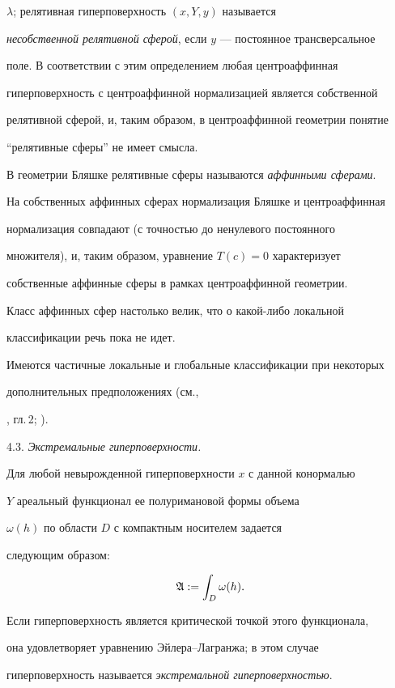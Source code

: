 $\lambda$; релятивная гиперповерхность $(x,Y,y)$ называется


{\it несобственной релятивной сферой}, если $y$ --- постоянное трансверсальное 


поле. В соответствии с этим определением любая центроаффинная


гиперповерхность с центроаффинной нормализацией является собственной


релятивной сферой, и, таким образом, в центроаффинной геометрии понятие


``релятивные сферы'' не имеет смысла.


В геометрии Бляшке релятивные сферы называются {\it аффинными сферами}.


На собственных аффинных сферах нормализация Бляшке и центроаффинная


нормализация совпадают (с точностью до ненулевого постоянного


множителя), и, таким образом, уравнение $T(c)=0$ характеризует


собственные аффинные сферы в рамках центроаффинной геометрии.


Класс аффинных сфер настолько велик, что о какой-либо локальной


классификации речь пока не идет.


Имеются частичные локальные и глобальные классификации при некоторых


дополнительных предположениях (см., 


\cite{LI-S-Z-1}, гл.\,2; \cite{VRA}).


\medskip





4.3. {\it Экстремальные гиперповерхности.}


Для любой невырожденной гиперповерхности $x$ с данной конормалью


$Y$ ареальный функционал ее полуримановой формы объема


$\omega (h)$ по области $D$ с компактным носителем задается


следующим образом:


$$


\frak{A} := \int_D \omega (h).


$$


Если гиперповерхность является критической точкой этого функционала,


она удовлетворяет уравнению Эйлера--Лагранжа; в этом случае


гиперповерхность называется {\it экстремальной гиперповерхностью}.


